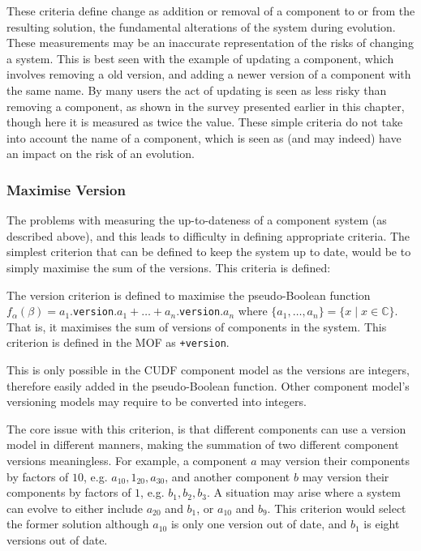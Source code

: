 These criteria define change as addition or removal of a component to or from the resulting solution, the fundamental alterations of the system during evolution.
These measurements may be an inaccurate representation of the risks of changing a system.
This is best seen with the example of updating a component, which involves removing a old version, and adding a newer version of a component with the same name.
By many users the act of updating is seen as less risky than removing a component, as shown in the survey presented earlier in this chapter,
though here it is measured as twice the value.
These simple criteria do not take into account the name of a component, which is seen as (and may indeed) have an impact on the risk of an evolution.

\subsubsection{Maximise Version}
The problems with measuring the up-to-dateness of a component system (as described above), and this leads to difficulty in defining appropriate criteria.
The simplest criterion that can be defined to keep the system up to date, would be to simply maximise the sum of the versions.
This criteria is defined:

\begin{defs}
	The version criterion is defined to maximise the pseudo-Boolean function $f_{\alpha}(\beta) = a_1$.\verb+version+$.a_1 + \ldots + a_n$.\verb+version+$.a_n$
	where $\{a_1,\ldots,a_n\} = \{x \mid x \in \mathbb{C}\}$.
	That is, it maximises the sum of versions of components in the system.
	This criterion is defined in the MOF as \verb!+version!.
\end{defs}

This is only possible in the CUDF component model as the versions are integers, therefore easily added in the pseudo-Boolean function.
Other component model's versioning models may require to be converted into integers.

The core issue with this criterion, is that different components can use a version model in different manners, making the summation of two different component versions meaningless.
For example, a component $a$ may version their components by factors of $10$, e.g. $a_{10},1_{20},a_{30}$, 
and another component $b$ may version their components by factors of $1$, e.g. $b_1,b_2,b_3$.
A situation may arise where a system can evolve to either include $a_20$ and $b_1$, or $a_10$ and $b_9$.
This criterion would select the former solution although $a_10$ is only one version out of date, and $b_1$ is eight versions out of date. 

